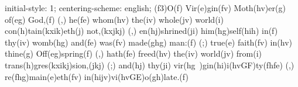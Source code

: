 initial-style: 1;
centering-scheme: english;
(f3)O(f) Vir(e)gin(fv) Moth(hv)er(g) of(eg) God,(f) (,) he(fe) whom(hv) the(iv) whole(jv) world(i) con(h)tain(kxik)eth(j) not,(kxjkj) (,) en(hj)shrined(ji) him(hg)self(hih) in(f) thy(iv) womb(hg) and(fe) was(fv) made(ghg) man:(f) (;) true(e) faith(fv) in(hv) thine(g) Off(eg)spring(f) (,) hath(fe) freed(hv) the(iv) world(jv) from(i) trans(h)gres(kxikj)sion,(jkj) (;) and(hj) thy(ji) vir(hg~)gin(hi)i(hvGF)ty(fhfe) (,) re(fhg)main(e)eth(fv) in(hijv)vi(hvGE)o(gh)late.(f)
